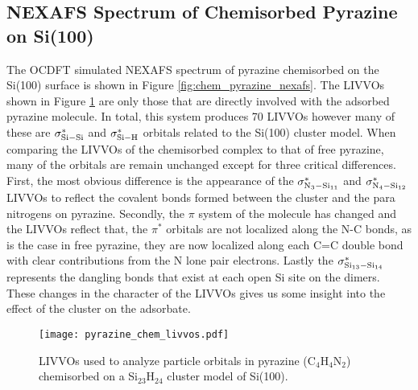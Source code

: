 \documentclass{article}
\begin{document}
\subsection*{NEXAFS Spectrum of Chemisorbed Pyrazine on Si(100)}
The OCDFT simulated NEXAFS spectrum of pyrazine chemisorbed on the Si(100) surface is shown in Figure \ref{fig:chem_pyrazine_nexafs}. The LIVVOs shown in Figure \ref{fig:chem_pyrazine_livvos} are only those that are directly involved with the adsorbed pyrazine molecule. In total, this system produces 70 LIVVOs however many of these are $\sigma^*_{\rm Si-Si}$ and  $\sigma^*_{\rm Si-H}$ orbitals related to the Si(100) cluster model. When comparing the LIVVOs of the chemisorbed complex to that of free pyrazine, many of the orbitals are remain unchanged except for  three critical differences. First, the most obvious difference is the appearance of the $\sigma^*_{\rm N_3-Si_{11}}$ and $\sigma^*_{\rm N_4-Si_{12}}$ LIVVOs to reflect the covalent bonds formed between the cluster and the para nitrogens on pyrazine. Secondly, the $\pi$ system of the molecule has changed and the LIVVOs reflect that, the $\pi^*$ orbitals are not localized along the N-C bonds, as is the case in free pyrazine, they are now localized along each C=C double bond with clear contributions from the N lone pair electrons. Lastly the $\sigma^*_{\rm Si_{13}-Si_{14}}$ represents the dangling bonds that exist at each open Si site on the dimers. These changes in the character of the LIVVOs gives us some insight into the effect of the cluster on the adsorbate. 

\begin{figure}[b!]
\centering
\texttt{[image: pyrazine\_chem\_livvos.pdf]}
\caption{LIVVOs used to analyze particle orbitals in pyrazine (C$_4$H$_4$N$_2$) chemisorbed on a Si$_{23}$H$_{24}$ cluster model of Si(100).}
\label{fig:chem_pyrazine_livvos}
\end{figure}
\end{document}
